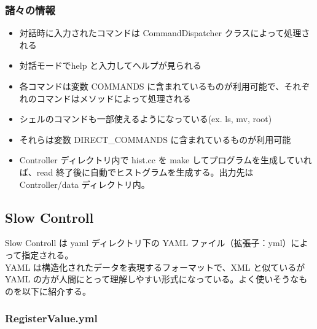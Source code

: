 \documentclass{jsarticle}
\begin{document}
\subsubsection{諸々の情報}
\begin{itemize}
\item 対話時に入力されたコマンドは CommandDispatcher クラスによって処理される
\item 対話モードでhelp と入力してヘルプが見られる
\item 各コマンドは変数 COMMANDS に含まれているものが利用可能で、それぞれのコマンドはメソッドによって処理される
\item シェルのコマンドも一部使えるようになっている(ex. ls, mv, root)
\item それらは変数 DIRECT\_COMMANDS に含まれているものが利用可能
\item Controller ディレクトリ内で hist.cc を make してプログラムを生成していれば、read 終了後に自動でヒストグラムを生成する。出力先は Controller/data ディレクトリ内。
\end{itemize}

\newpage
\subsection{Slow Controll}
Slow Controll は yaml ディレクトリ下の YAML ファイル（拡張子：yml）によって指定される。\\
YAML は構造化されたデータを表現するフォーマットで、XML と似ているが YAML の方が人間にとって理解しやすい形式になっている。よく使いそうなものを以下に紹介する。

\subsubsection{RegisterValue.yml}
\end{document}
